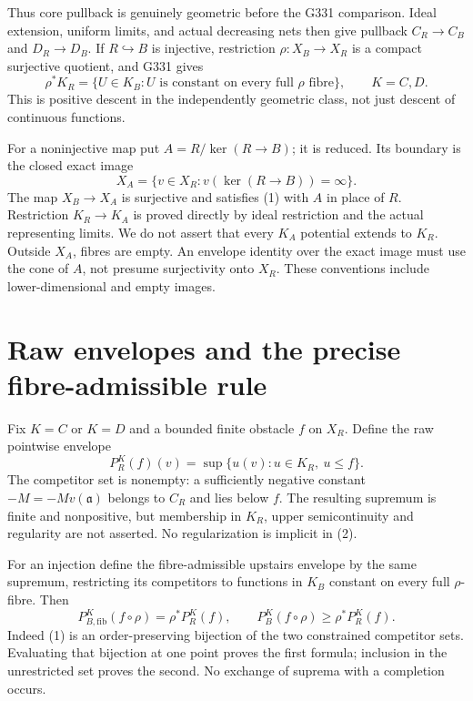\documentclass[11pt]{article}
\begin{document}
Thus core pullback is genuinely geometric before the G331 comparison.
Ideal extension, uniform limits, and actual decreasing nets then give
pullback \(C_R\to C_B\) and \(D_R\to D_B\).
If \(R\hookrightarrow B\) is injective, restriction
\(\rho:X_B\to X_R\) is a compact surjective quotient, and G331 gives
\[
 \rho^*K_R=\{U\in K_B:U\text{ is constant on every full }\rho
                       \text{ fibre}\},\qquad K=C,D.                 \tag{1}
\]
This is positive descent in the independently geometric class,
not just descent of continuous functions.

For a noninjective map put \(A=R/\ker(R\to B)\); it is reduced.
Its boundary is the closed exact image
\[
 X_A=\{v\in X_R:v(\ker(R\to B))=\infty\}.
\]
The map \(X_B\to X_A\) is surjective and satisfies (1) with \(A\)
in place of \(R\). Restriction \(K_R\to K_A\) is proved directly
by ideal restriction and the actual representing limits. We do not
assert that every \(K_A\) potential extends to \(K_R\).
Outside \(X_A\), fibres are empty. An envelope identity over the
exact image must use the cone of \(A\), not presume surjectivity
onto \(X_R\). These conventions include lower-dimensional and empty
images.

\section{Raw envelopes and the precise fibre-admissible rule}
\label{sec:envelope}
Fix \(K=C\) or \(K=D\) and a bounded finite obstacle \(f\) on \(X_R\).
Define the raw pointwise envelope
\[
 P_R^K(f)(v)=\sup\{u(v):u\in K_R,\ u\leq f\}.
                                                               \tag{2}
\]
The competitor set is nonempty: a sufficiently negative constant
\(-M=-Mv(\mathfrak a)\) belongs to \(C_R\) and lies below \(f\).
The resulting supremum is finite and nonpositive, but membership
in \(K_R\), upper semicontinuity and regularity are not asserted.
No regularization is implicit in (2).

For an injection define the fibre-admissible upstairs envelope by
the same supremum, restricting its competitors to functions in
\(K_B\) constant on every full \(\rho\)-fibre. Then
\[
 P_{B,\mathrm{fib}}^K(f\circ\rho)=\rho^*P_R^K(f),\qquad
 P_B^K(f\circ\rho)\geq\rho^*P_R^K(f).                            \tag{3}
\]
Indeed (1) is an order-preserving bijection of the two constrained
competitor sets. Evaluating that bijection at one point proves the
first formula; inclusion in the unrestricted set proves the second.
No exchange of suprema with a completion occurs.
\end{document}
